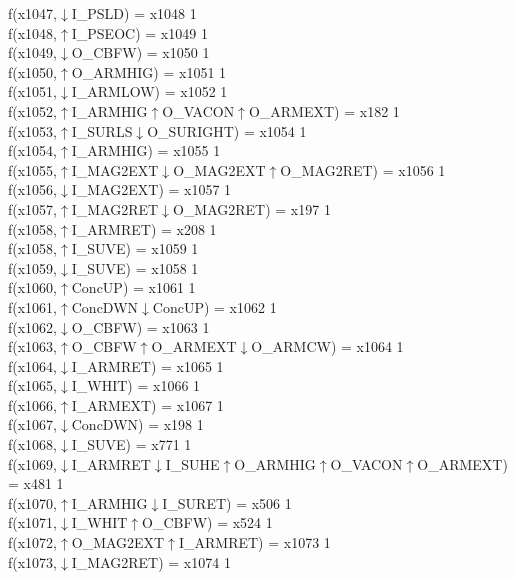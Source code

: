f(x1047,$\downarrow$I\_PSLD) = x1048 {1} \\
f(x1048,$\uparrow$I\_PSEOC) = x1049 {1} \\
f(x1049,$\downarrow$O\_CBFW) = x1050 {1} \\
f(x1050,$\uparrow$O\_ARMHIG) = x1051 {1} \\
f(x1051,$\downarrow$I\_ARMLOW) = x1052 {1} \\
f(x1052,$\uparrow$I\_ARMHIG$\uparrow$O\_VACON$\uparrow$O\_ARMEXT) = x182 {1} \\
f(x1053,$\uparrow$I\_SURLS$\downarrow$O\_SURIGHT) = x1054 {1} \\
f(x1054,$\uparrow$I\_ARMHIG) = x1055 {1} \\
f(x1055,$\uparrow$I\_MAG2EXT$\downarrow$O\_MAG2EXT$\uparrow$O\_MAG2RET) = x1056 {1} \\
f(x1056,$\downarrow$I\_MAG2EXT) = x1057 {1} \\
f(x1057,$\uparrow$I\_MAG2RET$\downarrow$O\_MAG2RET) = x197 {1} \\
f(x1058,$\uparrow$I\_ARMRET) = x208 {1} \\
f(x1058,$\uparrow$I\_SUVE) = x1059 {1} \\
f(x1059,$\downarrow$I\_SUVE) = x1058 {1} \\
f(x1060,$\uparrow$ConcUP) = x1061 {1} \\
f(x1061,$\uparrow$ConcDWN$\downarrow$ConcUP) = x1062 {1} \\
f(x1062,$\downarrow$O\_CBFW) = x1063 {1} \\
f(x1063,$\uparrow$O\_CBFW$\uparrow$O\_ARMEXT$\downarrow$O\_ARMCW) = x1064 {1} \\
f(x1064,$\downarrow$I\_ARMRET) = x1065 {1} \\
f(x1065,$\downarrow$I\_WHIT) = x1066 {1} \\
f(x1066,$\uparrow$I\_ARMEXT) = x1067 {1} \\
f(x1067,$\downarrow$ConcDWN) = x198 {1} \\
f(x1068,$\downarrow$I\_SUVE) = x771 {1} \\
f(x1069,$\downarrow$I\_ARMRET$\downarrow$I\_SUHE$\uparrow$O\_ARMHIG$\uparrow$O\_VACON$\uparrow$O\_ARMEXT) = x481 {1} \\
f(x1070,$\uparrow$I\_ARMHIG$\downarrow$I\_SURET) = x506 {1} \\
f(x1071,$\downarrow$I\_WHIT$\uparrow$O\_CBFW) = x524 {1} \\
f(x1072,$\uparrow$O\_MAG2EXT$\uparrow$I\_ARMRET) = x1073 {1} \\
f(x1073,$\downarrow$I\_MAG2RET) = x1074 {1} \\

